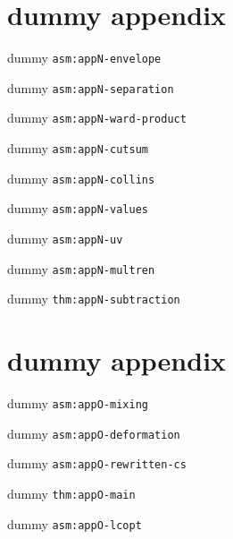 \chapter{dummy appendix}\label{app:appN}
\begin{assumption}\label{asm:appN-envelope}dummy \texttt{asm:appN-envelope}\end{assumption}
\begin{assumption}\label{asm:appN-separation}dummy \texttt{asm:appN-separation}\end{assumption}
\begin{assumption}\label{asm:appN-ward-product}dummy \texttt{asm:appN-ward-product}\end{assumption}
\begin{assumption}\label{asm:appN-cutsum}dummy \texttt{asm:appN-cutsum}\end{assumption}
\begin{assumption}\label{asm:appN-collins}dummy \texttt{asm:appN-collins}\end{assumption}
\begin{assumption}\label{asm:appN-values}dummy \texttt{asm:appN-values}\end{assumption}
\begin{assumption}\label{asm:appN-uv}dummy \texttt{asm:appN-uv}\end{assumption}
\begin{assumption}\label{asm:appN-multren}dummy \texttt{asm:appN-multren}\end{assumption}
\begin{theorem}\label{thm:appN-subtraction}dummy \texttt{thm:appN-subtraction}\end{theorem}
\setcounter{chapter}{15}\addtocounter{chapter}{-1}
\chapter{dummy appendix}\label{app:appO}
\begin{assumption}\label{asm:appO-mixing}dummy \texttt{asm:appO-mixing}\end{assumption}
\begin{assumption}\label{asm:appO-deformation}dummy \texttt{asm:appO-deformation}\end{assumption}
\begin{assumption}\label{asm:appO-rewritten-cs}dummy \texttt{asm:appO-rewritten-cs}\end{assumption}
\begin{theorem}\label{thm:appO-main}dummy \texttt{thm:appO-main}\end{theorem}
\begin{assumption}\label{asm:appO-lcopt}dummy \texttt{asm:appO-lcopt}\end{assumption}
\endgroup
